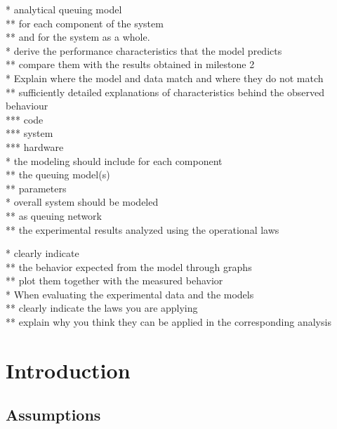 \documentclass[a4paper]{article}
\begin{document}
{
* analytical queuing model\\
** for each component of the system\\
** and for the system as a whole.\\

* derive the performance characteristics that the model predicts\\
** compare them with the results obtained in milestone 2\\

* Explain where the model and data match and where they do not match\\
** sufficiently detailed explanations of characteristics behind the observed behaviour\\
*** code\\
*** system\\
*** hardware\\

* the modeling should include for each component\\
** the queuing model(s)\\
** parameters\\

* overall system should be modeled\\
** as queuing network\\
{\color{red}** the experimental results analyzed using the operational laws\\}

{
\color{red}
* clearly indicate\\
** the behavior expected from the model through graphs\\
** plot them together with the measured behavior\\

* When evaluating the experimental data and the models\\
** clearly indicate the laws you are applying\\
** explain why you think they can be applied in the corresponding analysis\\
}

\section{Introduction}

\subsection{Assumptions}

}
\end{document}

